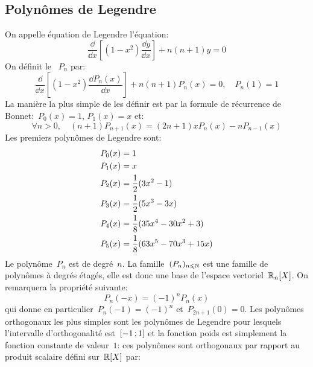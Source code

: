 \subsection{Polynômes de Legendre} 
On appelle équation de Legendre l'équation: 
\begin{equation}
\frac{\dd }{\dd x}[(1-x^{2})\frac{\dd y}{\dd x}]+n(n+1)y=0
\end{equation}
On définit le ~$P_n$ par: 
\begin{equation}
\frac{\dd}{\dd x}[(1-x^{2})\frac{\dd P_n(x)}{\dd x}]+n(n+1)P_n(x)=0,\quad P_n(1)=1
\end{equation}
La manière la plus simple de les définir est par la formule de récurrence de Bonnet:~$P_0(x)=1$, $P_1(x)=x$ et:
\begin{equation}
\forall n>0, \quad (n+1)P_{n+1}(x)=(2n+1)xP_n(x) - nP_{n-1}(x)
\end{equation}
Les premiers polynômes de Legendre sont:
\begin{equation}\colorgris
\begin{aligned}
&P_{0}(x)=1\\
&P_{1}(x)=x\\
&P_{2}(x)=\frac{1}{2}(3x^{2}-1)\\
&P_{3}(x)=\frac{1}{2}(5x^{3}-3x)\\
&P_{4}(x)=\frac{1}{8}(35x^{4}-30x^{2}+3)\\
&P_{5}(x)=\frac{1}{8}(63x^{5}-70x^{3}+15x)
\end{aligned}
\end{equation} 
Le polynôme~$P_n$ est de degré~$n$. La famille~$(P_n)_{n\leqslant \mathbb N}$ est une famille de polynômes à degrés étagés, elle est donc une base de l'espace vectoriel~$\mathbb R_n[X]$. On remarquera la propriété suivante: 
\begin{equation}
P_n(-x)=(-1)^nP_n(x)
\end{equation}
qui donne en particulier~$P_n( - 1) = ( - 1)^n$ et~$P_{2n + 1}(0) = 0$. Les polynômes orthogonaux les plus simples sont les polynômes de Legendre pour lesquels l'intervalle d'orthogonalité est~$\mathopen{[}-1\,;1\mathclose{]}$ et la fonction poids est simplement la fonction constante de valeur~$1$: ces polynômes sont orthogonaux par rapport au produit scalaire défini sur~$\mathbb R[X]$ par: 
